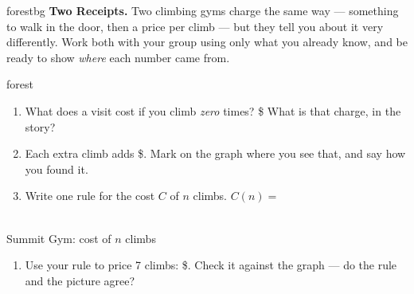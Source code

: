 \documentclass[12pt]{article}
\newcommand{\answerspace}[2]{\par\nopagebreak\noindent\begin{minipage}[t][#1][t]{\linewidth}%
  \color{keyred}\bfseries #2\end{minipage}\par}
\newcommand{\gymgrid}{%
  \draw[xstep=1, ystep=3, linegray!40, very thin] (0,0) grid (8,30);
  \draw[->, semithick, charcoal] (0,0)--(8.7,0) node[right, font=\scriptsize]{$n$};
  \draw[->, semithick, charcoal] (0,0)--(0,32) node[above, font=\scriptsize]{$C$ (\$)};
  \foreach \x in {2,4,6,8} \node[charcoal, font=\tiny, below] at (\x,0){\x};
  \foreach \y in {6,12,18,24,30} \node[charcoal, font=\tiny, left] at (0,\y){\y};}
\begin{document}

\vspace{0.06in}

\begin{headlinebox}{forestbg}
\textbf{Two Receipts.} Two climbing gyms charge the same way --- something to walk in the door, then a
price per climb --- but they tell you about it very differently. Work both with your group using only
what you already know, and be ready to show \emph{where} each number came from.
\end{headlinebox}

\vspace{0.04in}

\begin{scenariobox}{forest}
\begin{minipage}[t]{0.54\linewidth}
\vspace{0pt}
\begin{enumerate}[label=\textbf{\alph*.}, leftmargin=1.8em, itemsep=4pt]
  \item What does a visit cost if you climb \emph{zero} times? \$\blank{1.2cm} \;
        What is that charge, in the story?
        \answerspace{1.2cm}{}
  \item Each extra climb adds \$\blank{1.2cm}. Mark on the graph where you see that, and say how
        you found it.
        \answerspace{1.4cm}{}
  \item Write one rule for the cost $C$ of $n$ climbs. \; $C(n) = $ \blank{3.0cm}
\end{enumerate}
\end{minipage}\hfill
\begin{minipage}[t]{0.42\linewidth}
\vspace{0pt}\centering
{}\\[1pt]
{\footnotesize Summit Gym: cost of $n$ climbs}
\end{minipage}

\begin{enumerate}[label=\textbf{\alph*.}, start=4, leftmargin=1.8em, itemsep=4pt]
  \item Use your rule to price 7 climbs: \$\blank{1.6cm}. Check it against the graph --- do the
        rule and the picture agree? \blank{2.0cm}
\end{enumerate}
\end{scenariobox}
\end{document}
